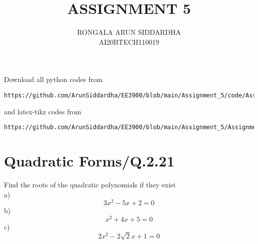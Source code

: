 \documentclass[journal,12pt,twocolumn]{IEEEtran}
\begin{document}
     \def\centbox#1{\makebox[0in]{#1}}
     \def\topbox#1{\raisebox{-\baselineskip}[0in][0in]{#1}}
     \def\midbox#1{\raisebox{-0.5\baselineskip}[0in][0in]{#1}}
\vspace{3cm}
\title{ASSIGNMENT 5}
\author{RONGALA ARUN SIDDARDHA \\ AI20BTECH110019}
\maketitle
\newpage
\bigskip
\renewcommand{\thefigure}{\theenumi}
\renewcommand{\thetable}{\theenumi}
Download all python codes from 
\begin{lstlisting}
https://github.com/ArunSiddardha/EE3900/blob/main/Assignment_5/code/Assignment_5.py
\end{lstlisting}
%
and latex-tikz codes from 
%
\begin{lstlisting}
https://github.com/ArunSiddardha/EE3900/blob/main/Assignment_5/Assignment_5.tex
\end{lstlisting}
%
\section{Quadratic Forms/Q.2.21}
Find the roots of the quadratic polynomials if they exist \\
a)$$3x^2-5x+2=0$$
b)$$x^2+4x+5=0$$
c)$$2x^2-2\sqrt{2}x+1=0$$
\end{document}
